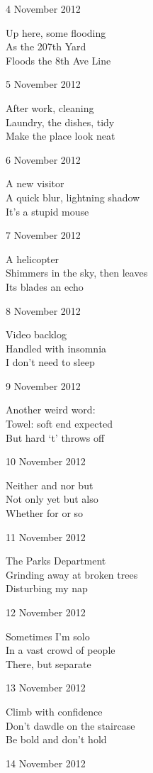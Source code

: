 \documentclass[12pt]{article}
\begin{document}
4 November 2012

Up here, some flooding \\
As the 207th Yard \\
Floods the 8th Ave Line

5 November 2012

After work, cleaning \\
Laundry, the dishes, tidy \\
Make the place look neat

6 November 2012

A new visitor \\
A quick blur, lightning shadow \\
It's a stupid mouse

7 November 2012

A helicopter \\
Shimmers in the sky, then leaves \\
Its blades an echo

8 November 2012

Video backlog \\
Handled with insomnia \\
I don't need to sleep

9 November 2012

Another weird word: \\
Towel: soft end expected \\
But hard `t' throws off

\newpage

10 November 2012

Neither and nor but \\
Not only yet but also \\
Whether for or so

11 November 2012

The Parks Department \\
Grinding away at broken trees \\
Disturbing my nap

12 November 2012

Sometimes I'm solo \\
In a vast crowd of people \\
There, but separate

13 November 2012

Climb with confidence \\
Don't dawdle on the staircase \\
Be bold and don't hold

14 November 2012
\end{document}
